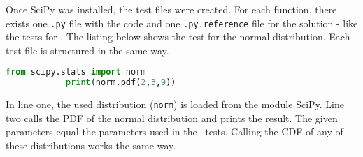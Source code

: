 	Once \ac{SciPy} was installed, the test files were created. For each function, there exists one \lstinline{.py} file with the code and one \lstinline{.py.reference} file for the solution - like the tests for \setlx. The listing below shows the test for the normal distribution. Each test file is structured in the same way.

	\begin{center}
		\begin{lstlisting}[caption={Install Virtual Environment and SciPy}, language={Python}, label={lis:pythontest}]
			from scipy.stats import norm
			print(norm.pdf(2,3,9))
		\end{lstlisting}
	\end{center}

	In line one, the used distribution (\lstinline{norm}) is loaded from the module \ac{SciPy}. Line two calls the \ac{PDF} of the normal distribution and prints the result. The given parameters equal the parameters used in the \setlx\ tests. Calling the \ac{CDF} of any of these distributions works the same way.